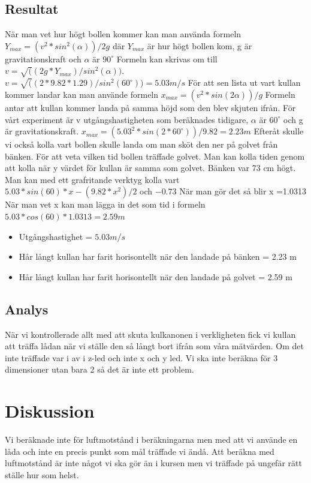 \documentclass[11p]{article}
\begin{document}
    \subsection{Resultat}
    När man vet hur högt bollen kommer kan man använda formeln $Y_{max}=(v^2 * sin^2(\alpha))/2g$ där $Y_{max}$ är hur högt bollen kom, g är gravitationskraft och $\alpha$ är $90^{\circ}$
    Formeln kan skrivas om till $v=\sqrt((2g*Y_{max})/sin^2(\alpha))$.
    \newline $v=\sqrt((2*9.82*1.29)/sin^2(60^{\circ})) = 5.03 m/s$
    \newline\newline
    För att sen lista ut vart kullan kommer landar kan man använde formeln $x_{max}=(v^2*sin(2\alpha))/g$
    Formeln antar att kullan kommer landa på samma höjd som den blev skjuten ifrån.
    För vårt experiment är v utgångshastigheten som beräknades tidigare, $\alpha$ är $60^{\circ}$ och g är gravitationskraft.
    \newline $x_{max}=(5.03^2*sin(2*60^{\circ}))/9.82 = 2.23 m$
    \newline\newline
    Efteråt skulle vi också kolla vart bollen skulle landa om man sköt den ner på golvet från bänken.
    För att veta vilken tid bollen träffade golvet.
    Man kan kolla tiden genom att kolla när y värdet för kullan är samma som golvet.
    Bänken var 73 cm högt.
    Man kan med ett grafritande verktyg kolla vart $5.03*sin(60)*x-(9.82*x^2)/2$ och $-0.73$
    När man gör det så blir x =1.0313
    \newline När man vet x kan man lägga in det som tid i formeln $5.03*cos(60)*1.0313 = 2.59 m$
    \begin{itemize}
        \item Utgångshastighet = $5.03 m/s$
        \item Hår långt kullan har farit horisontellt när den landade på bänken = 2.23 m
        \item Hår långt kullan har farit horisontellt när den landade på golvet = 2.59 m
    \end{itemize}
    \subsection{Analys}
    När vi kontrollerade allt med att skuta kulkanonen i verkligheten fick vi kullan att träffa lådan när vi ställe den så långt bort ifrån som våra mätvärden.
    Om det inte träffade var i av i z-led och inte x och y led.
    Vi ska inte beräkna för 3 dimensioner utan bara 2 så det är inte ett problem.
    \section{Diskussion}
    Vi beräknade inte för luftmotstånd i beräkningarna men med att vi använde en låda och inte en precis punkt som mål träffade vi ändå.
    Att beräkna med luftmotstånd är inte något vi ska gör än i kursen men vi träffade på ungefär rätt ställe hur som helst.
\end{document}
